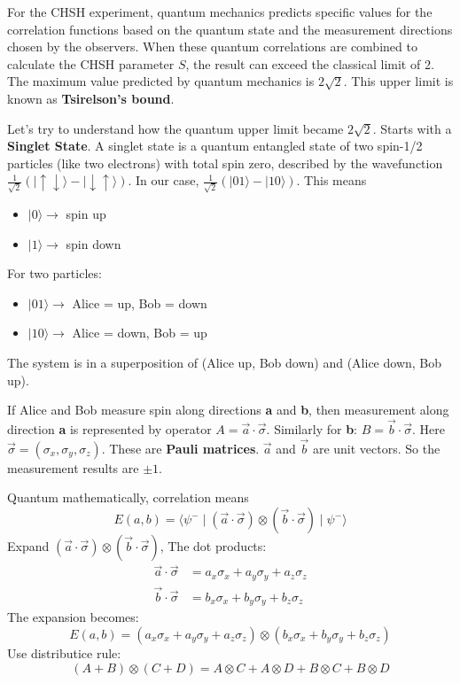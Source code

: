 \documentclass[17pt,a4paper]{extarticle}
\begin{document}
For the CHSH experiment, quantum mechanics predicts specific values for the correlation functions based on the quantum state and the measurement directions chosen by the observers. When these quantum correlations are combined to calculate the CHSH parameter $S$, the result can exceed the classical limit of 2. The maximum value predicted by quantum mechanics is $2\sqrt{2}$. This upper limit is known as \textbf{Tsirelson’s bound}.

Let's try to understand how the quantum upper limit became $2\sqrt{2}$. Starts with a \textbf{Singlet State}. A singlet state is a quantum entangled state of two spin-1/2 particles (like two electrons) with total spin zero, described by the wavefunction $\frac{1}{\sqrt{2}}\left(\lvert \uparrow \downarrow \rangle - \lvert \downarrow \uparrow \rangle\right)$. In our case, $\frac{1}{\sqrt{2}}\left(\lvert 01 \rangle - \lvert 10 \rangle\right)$. This means
\begin{itemize}
\item $\lvert 0 \rangle \rightarrow$ spin up
\item $\lvert 1 \rangle \rightarrow$ spin down
\end{itemize}
For two particles:
\begin{itemize}
\item $\lvert 01 \rangle \rightarrow$ Alice = up, Bob = down
\item $\lvert 10 \rangle \rightarrow$ Alice = down, Bob = up
\end{itemize}
The system is in a superposition of (Alice up, Bob down) and (Alice down, Bob up).

If Alice and Bob measure spin along directions \textbf{a} and \textbf{b}, then measurement along direction \textbf{a} is represented by operator $A = \vec{a} \cdot \vec{\sigma}$. Similarly for \textbf{b}: $B = \vec{b} \cdot \vec{\sigma}$. Here $\vec{\sigma} = (\sigma_x, \sigma_y, \sigma_z)$. These are \textbf{Pauli matrices}. $\vec{a}$ and $\vec{b}$ are unit vectors. So the measurement results are $\pm1$.

Quantum mathematically, correlation means
\setcounter{equation}{0}
\begin{equation}
E(a,b) = \langle \psi^- \mid (\vec{a} \cdot \vec{\sigma}) \otimes (\vec{b} \cdot \vec{\sigma}) \mid \psi^- \rangle
\end{equation}
Expand $(\vec{a} \cdot \vec{\sigma}) \otimes (\vec{b} \cdot \vec{\sigma})$,
The dot products:
\[
\begin{aligned}
\vec{a} \cdot \vec{\sigma} &= a_x \sigma_x + a_y \sigma_y + a_z \sigma_z \\
\vec{b} \cdot \vec{\sigma} &= b_x \sigma_x + b_y \sigma_y + b_z \sigma_z
\end{aligned}
\]
The expansion becomes:
\begin{equation}
E(a,b)=(a_x \sigma_x + a_y \sigma_y + a_z \sigma_z)
\otimes
(b_x \sigma_x + b_y \sigma_y + b_z \sigma_z)
\end{equation}
Use distributice rule:
\[
(A + B) \otimes (C + D) = A \otimes C + A \otimes D + B \otimes C + B \otimes D
\]
\end{document}
